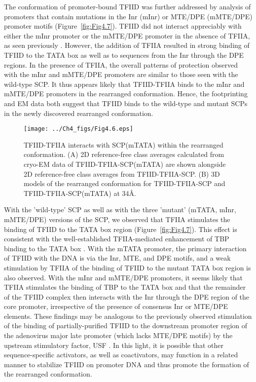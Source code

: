 \indent The conformation of promoter-bound TFIID was further addressed by analysis of promoters that contain mutations in the Inr (mInr) or MTE/DPE (mMTE/DPE) promoter motifs (Figure~\ref{fig:Fig4.7}). TFIID did not interact appreciably with either the mInr promoter or the mMTE/DPE promoter in the absence of TFIIA, as seen previously \cite{Juven-Gershon_1249}. However, the addition of TFIIA resulted in strong binding of TFIID to the TATA box as well as to sequences from the Inr through the DPE regions. In the presence of TFIIA, the overall patterns of protection observed with the mInr and mMTE/DPE promoters are similar to those seen with the wild-type SCP. It thus appears likely that TFIID-TFIIA binds to the mInr and mMTE/DPE promoters in the rearranged conformation.  Hence, the footprinting and EM data both suggest that TFIID binds to the wild-type and mutant SCPs in the newly discovered rearranged conformation.
\begin{figure}
\centering
\texttt{[image: ../Ch4\_figs/Fig4.6.eps]}
\caption[TFIID-TFIIA interacts with SCP(mTATA) within the rearranged conformation]{TFIID-TFIIA interacts with SCP(mTATA) within the rearranged conformation.  (A) 2D reference-free class averages calculated from cryo-EM data of TFIID-TFIIA-SCP(mTATA) are shown alongside 2D reference-free class averages from TFIID-TFIIA-SCP. (B) 3D models of the rearranged conformation for TFIID-TFIIA-SCP and TFIID-TFIIA-SCP(mTATA) at 34\AA. }
\label{fig:Fig4.6}
\end{figure}
\indent With the 'wild-type' SCP as well as with the three 'mutant' (mTATA, mInr, mMTE/DPE) versions of the SCP, we observed that TFIIA stimulates the binding of TFIID to the TATA box region (Figure~\ref{fig:Fig4.7}). This effect is consistent with the well-established TFIIA-mediated enhancement of TBP binding to the TATA box \cite{Thomas_1201}. With the mTATA promoter, the primary interaction of TFIID with the DNA is via the Inr, MTE, and DPE motifs, and a weak stimulation by TFIIA of the binding of TFIID to the mutant TATA box region is also observed. With the mInr and mMTE/DPE promoters, it seems likely that TFIIA stimulates the binding of TBP to the TATA box and that the remainder of the TFIID complex then interacts with the Inr through the DPE region of the core promoter, irrespective of the presence of consensus Inr or MTE/DPE elements. These findings may be analogous to the previously observed stimulation of the binding of partially-purified TFIID to the downstream promoter region of the adenovirus major late promoter (which lacks MTE/DPE motifs) by the upstream stimulatory factor, USF \cite{Sawadogo_3840,Va_3783}. In this light, it is possible that other sequence-specific activators, as well as coactivators, may function in a related manner to stabilize TFIID on promoter DNA and thus promote the formation of the rearranged conformation. 


